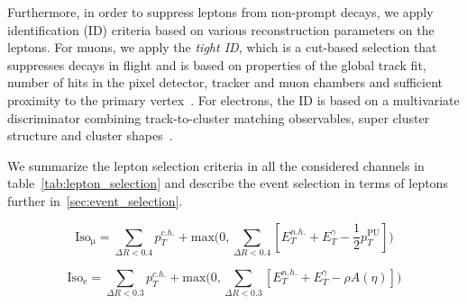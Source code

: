Furthermore, in order to suppress leptons from non-prompt decays, we apply identification (ID) criteria based on various reconstruction parameters on the leptons. For muons, we apply the \textit{tight ID}, which is a cut-based selection that suppresses decays in flight and is based on properties of the global track fit, number of hits in the pixel detector, tracker and muon chambers and sufficient proximity to the primary vertex~\cite{Chatrchyan:2012xi,CMS:2017_muon_pog}. For electrons, the ID is based on a multivariate discriminator combining track-to-cluster matching observables, super cluster structure and cluster shapes~\cite{Khachatryan:2015hwa,CMS:2017_egamma_pog}.

We summarize the lepton selection criteria in all the considered channels in table~\cref{tab:lepton_selection} and describe the event selection in terms of leptons further in~\cref{sec:event_selection}.

\begin{equation}
\label{eq:iso_mu}
\mathrm{Iso}_{\mathrm{\mu}} = \sum_{\Delta R < 0.4} p_T^{c.h.} + \mathrm{max}\biggl(0, \sum_{\Delta R < 0.4} [E_T^{n.h.} + E_T^{\gamma} - \frac{1}{2} p_T^{\mathrm{PU}}] \biggr)
\end{equation}

\begin{equation}
\label{eq:iso_el}
\mathrm{Iso}_{\mathrm{e}} = \sum_{\Delta R < 0.3} p_T^{c.h.} + \mathrm{max}\biggl(0, \sum_{\Delta R < 0.3} [E_T^{n.h.} + E_T^{\gamma} - \rho A(\eta)] \biggr)
\end{equation}

